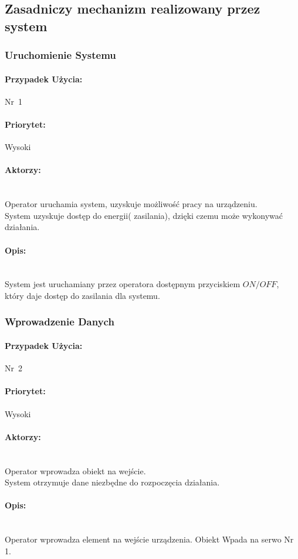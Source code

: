 \documentclass[12pt]{article}
\begin{document}
\subsection{Zasadniczy mechanizm realizowany przez system}
\subsubsection{Uruchomienie Systemu}
\paragraph{Przypadek Użycia:}\mbox{Nr 1}
\paragraph{Priorytet:}\mbox{Wysoki}	
\paragraph{Aktorzy:}\mbox{} \\
Operator uruchamia system, uzyskuje możliwość pracy na urządzeniu.\\
System uzyskuje dostęp do energii( zasilania), dzięki czemu może wykonywać działania.
\paragraph{Opis:}\mbox{} \\
System jest uruchamiany przez operatora dostępnym przyciskiem $ON/OFF$, który daje dostęp do zasilania dla systemu.

\subsubsection{Wprowadzenie Danych}
\paragraph{Przypadek Użycia:}\mbox{Nr 2}
\paragraph{Priorytet:}\mbox{Wysoki}	
\paragraph{Aktorzy:}\mbox{} \\
Operator wprowadza obiekt na wejście.\\
System otrzymuje dane niezbędne do rozpoczęcia działania.
\paragraph{Opis:}\mbox{} \\
Operator wprowadza element na wejście urządzenia. Obiekt Wpada na serwo Nr 1.
\end{document}

